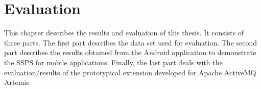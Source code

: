 \chapter{Evaluation}\label{chapter:evaluation}

This chapter describes the results and evaluation of this thesis. It consists of three parts. The first part describes the data set used for evaluation. The second part describes the results obtained from the Android application to demonstrate the SSPS for mobile applications. Finally, the last part deals with the evaluation/results of the prototypical extension developed for Apache ActiveMQ Artemis.

